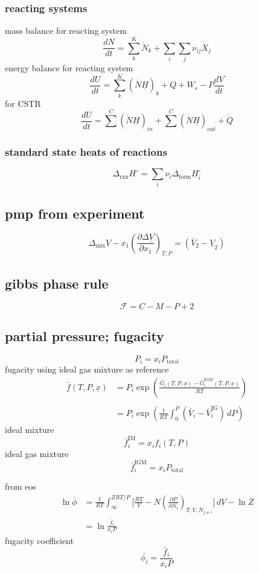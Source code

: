 \documentclass{article}
\begin{document}
\subsubsection*{reacting systems}
mass balance for reacting system
\[\frac{dN}{dt} = \sum_{k}^K \dot{N}_{k} + \sum_{i} \sum_{j} \nu_{ij} \dot{X}_{j}\]
energy balance for reacting system
\[\frac{dU}{dt} = \sum_{k}^K(\dot{N}\underline{H})_{k} + \dot{Q} + W_{s} -P \frac{dV}{dt}\]
for CSTR
\[\frac{dU}{dt} = \sum^{C} (\dot{N}\underline{H})_{in} + \sum^{C} (\dot{N}\underline{H})_{out} + \dot{Q} \]
\subsubsection*{standard state heats of reactions}
\[\Delta_{\text{rxn}} H^{\circ} = \sum_{i} \nu_{i}\Delta_{\text{form}} \underline{H}_{i}^{\circ}\]
\subsection*{pmp from experiment}
\[\Delta_{\text{mix}} \underline{V} - x_{1} \left(\frac{ \partial \Delta \underline{V} }{ \partial x_{1} } \right)_{T,P} = (\bar{V}_{2} - \underline{V}_{2})\]
\subsection*{gibbs phase rule}
\[\mathcal{F} = C - M - P + 2\]
\subsection*{partial pressure; fugacity}
\[P_{i} = x_{i}P_{\text{total}}\]
fugacity using ideal gas mixture as reference
\begin{align*}
    \bar{f}(T,P,\underline{x}) &= P_i \exp \left( \frac{\bar{G}_{i} (T,P,\underline{x}) - \bar{G}_{i}^{\text{IGM}}(T,P,\underline{x})}{RT} \right)  \\ \\
    &= P_i \exp \left( \frac{1}{RT} \int_{0}^P (\bar{V}_{i}- \bar{V}_{i}^{\text{IG}})\,dP \right)
\end{align*} 
ideal mixture
\[\bar{f}_{i}^{\text{IM}} = x_{i}f_{i}(T,P)\]
ideal gas mixture
\[ \bar{f}_{i}^{\text{IGM}} = x_{i} P_{\text{total}} \]


from eos
\begin{align*}
    \ln \bar{\phi}  &= \frac{1}{RT}\int_{\infty}^{ZRT/P} \biggl[  \frac{RT}{V} - N \left(\frac{ \partial P }{ \partial N_{i} } \right)_{T,V,N_{j \neq i}} \biggr] \, d\underline{V} - \ln Z \\
    &= \ln \frac{\bar{f}_i}{x_i P}
\end{align*}
fugacity coefficient
\[ \bar{\phi_i} = \frac{\bar{f}_i}{x_i P}\]
\end{document}
